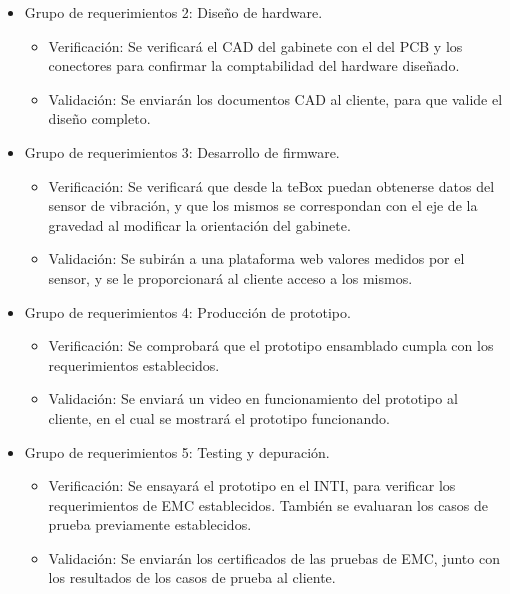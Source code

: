 \documentclass[11pt]{charter}
\begin{document}
\begin{itemize}
\item Grupo de requerimientos 2: Diseño de hardware.
\begin{itemize}
\item Verificación: Se verificará el CAD del gabinete con el del PCB y los conectores para confirmar la comptabilidad del hardware diseñado.
\item Validación: Se enviarán los documentos CAD al cliente, para que valide el diseño completo.
\end{itemize}
\end{itemize}


\begin{itemize}
\item Grupo de requerimientos 3: Desarrollo de firmware.
\begin{itemize}
\item Verificación: Se verificará que desde la teBox puedan obtenerse datos del sensor de vibración, y que los mismos se correspondan con el eje de la gravedad al modificar la orientación del gabinete.
\item Validación: Se subirán a una plataforma web valores medidos por el sensor, y se le proporcionará al cliente acceso a los mismos.
\end{itemize}
\end{itemize}


\begin{itemize}
\item Grupo de requerimientos 4: Producción de prototipo.
\begin{itemize}
\item Verificación: Se comprobará que el prototipo ensamblado cumpla con los requerimientos establecidos.
\item Validación: Se enviará un video en funcionamiento del prototipo al cliente, en el cual se mostrará el prototipo funcionando.
\end{itemize}
\end{itemize}


\begin{itemize}
\item Grupo de requerimientos 5: Testing y depuración.
\begin{itemize}
\item Verificación: Se ensayará el prototipo en el INTI, para verificar los requerimientos de EMC establecidos. También se evaluaran los casos de prueba previamente establecidos.
\item Validación: Se enviarán los certificados de las pruebas de EMC, junto con los resultados de los casos de prueba al cliente.
\end{itemize}
\end{itemize}
\end{document}
